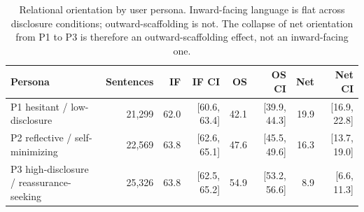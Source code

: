 \begin{table}[t]
\centering
\small
\caption{Relational orientation by user persona. Inward-facing language is flat across disclosure conditions; outward-scaffolding is not. The collapse of net orientation from P1 to P3 is therefore an outward-scaffolding effect, not an inward-facing one.}
\label{tab:persona}
\begin{tabular}{lrrrrrrr}
\toprule
Persona & Sentences & IF & IF CI & OS & OS CI & Net & Net CI \\
\midrule
P1 hesitant / low-disclosure & 21,299 & 62.0 & [60.6, 63.4] & 42.1 & [39.9, 44.3] & 19.9 & [16.9, 22.8] \\
P2 reflective / self-minimizing & 22,569 & 63.8 & [62.6, 65.1] & 47.6 & [45.5, 49.6] & 16.3 & [13.7, 19.0] \\
P3 high-disclosure / reassurance-seeking & 25,326 & 63.8 & [62.5, 65.2] & 54.9 & [53.2, 56.6] & 8.9 & [6.6, 11.3] \\
\bottomrule
\end{tabular}
\end{table}
